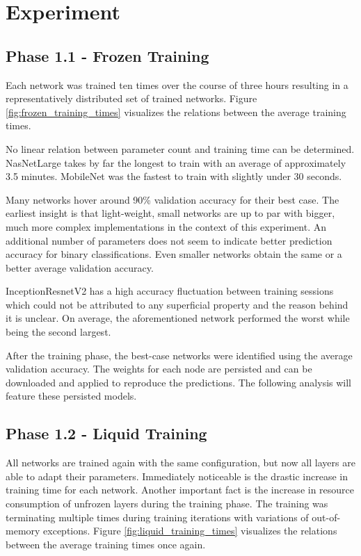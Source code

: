 
\section{Experiment}
\subsection{Phase 1.1 - Frozen Training}

Each network was trained ten times over the course of three hours resulting in a representatively distributed set of trained networks.
Figure \ref{fig:frozen_training_times} visualizes the relations between the average training times.



No linear relation between parameter count and training time can be determined.
NasNetLarge takes by far the longest to train with an average of approximately 3.5 minutes. 
MobileNet was the fastest to train with slightly under 30 seconds.





Many networks hover around 90\% validation accuracy for their best case.
The earliest insight is that light-weight, small networks are up to par with bigger, much more complex implementations in the context of this experiment.
An additional number of parameters does not seem to indicate better prediction accuracy for binary classifications.
Even smaller networks obtain the same or a better average validation accuracy.

InceptionResnetV2 has a high accuracy fluctuation between training sessions which could not be attributed to any superficial property and the reason behind it is unclear.
On average, the aforementioned network performed the worst while being the second largest.

After the training phase, the best-case networks were identified using the average validation accuracy.
The weights for each node are persisted and can be downloaded and applied to reproduce the predictions.
The following analysis will feature these persisted models.


\subsection{Phase 1.2 - Liquid Training}
All networks are trained again with the same configuration, but now all layers are able to adapt their parameters.
Immediately noticeable is the drastic increase in training time for each network.
Another important fact is the increase in resource consumption of unfrozen layers during the training phase.
The training was terminating multiple times during training iterations with variations of out-of-memory exceptions.
Figure \ref{fig:liquid_training_times} visualizes the relations between the average training times once again.


